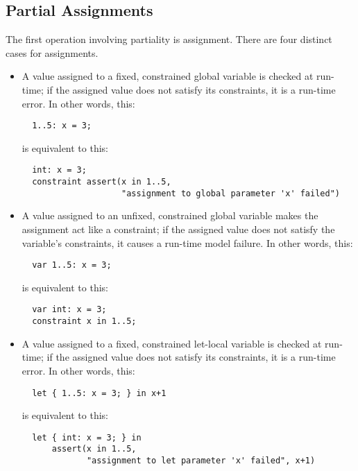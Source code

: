 \documentclass[10pt]{scrartcl}
\begin{document}
\subsection{Partial Assignments}
The first operation involving partiality is assignment.  There are four
distinct cases for assignments.
\begin{itemize}
\item
    A value assigned to a fixed, constrained global variable is checked at
    run-time;  if the assigned value does not satisfy its constraints, it is
    a run-time error.  In other words, this:
\begin{verbatim}
  1..5: x = 3;
\end{verbatim}
    is equivalent to this:
\begin{verbatim}
  int: x = 3;
  constraint assert(x in 1..5,
                    "assignment to global parameter 'x' failed")
\end{verbatim}

\item
    A value assigned to an unfixed, constrained global variable makes the
    assignment act like a constraint;  if the assigned value does not
    satisfy the variable's constraints, it causes a run-time model failure.
    In other words, this:
\begin{verbatim}
  var 1..5: x = 3;
\end{verbatim}
    is equivalent to this:
\begin{verbatim}
  var int: x = 3;
  constraint x in 1..5;
\end{verbatim}

\item
    A value assigned to a fixed, constrained let-local variable is checked at
    run-time;  if the assigned value does not satisfy its constraints, it is
    a run-time error.  In other words, this:
\begin{verbatim}
  let { 1..5: x = 3; } in x+1
\end{verbatim}
    is equivalent to this:
\begin{verbatim}
  let { int: x = 3; } in
      assert(x in 1..5,
             "assignment to let parameter 'x' failed", x+1)
\end{verbatim}


\end{itemize}
\end{document}
